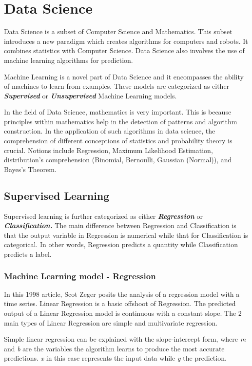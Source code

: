 \section{Data Science}
Data Science is a subset of Computer Science and Mathematics. This subset introduces a new paradigm which creates algorithms for computers and robots. It combines statistics with Computer Science. Data Science also involves the use of machine learning algorithms for prediction.

Machine Learning is a novel part of Data Science and it encompasses the ability of machines to learn from examples. These models are categorized as either \textbf{\textit{Supervised}} or \textbf{\textit{Unsupervised}} Machine Learning models. 

In the field of Data Science, mathematics is very important. This is because principles within mathematics help in the detection of patterns and algorithm construction. In the application of such algorithms in data science, the comprehension of different conceptions of statistics and probability theory is crucial. Notions include Regression, Maximum Likelihood Estimation, distribution's comprehension (Binomial, Bernoulli, Gaussian (Normal)), and Bayes's Theorem.

\subsection{Supervised Learning} %
Supervised learning is further categorized as  either \textbf{\textit{Regression}} or \textbf{\textit{Classification.}} The main difference between Regression and Classification is that the output variable in Regression is numerical while that for Classification is categorical. In other words, Regression predicts a quantity while  Classification predicts a label.


\subsubsection{Machine Learning model - Regression}
In this 1998 article, \cite{zeger1988regression} Scot Zeger posits the analysis of a regression model with a time series. Linear Regression is a basic offshoot of Regression. The predicted output of a Linear Regression model is continuous with a constant slope. The 2 main types of Linear Regression are simple and multivariate regression. 

Simple linear regression can be explained with the slope-intercept form, where \textit{m} and \textit{b} are the variables the algorithm learns to produce the most accurate predictions. \textit{x} in this case represents the input data while \textit{y} the prediction.

